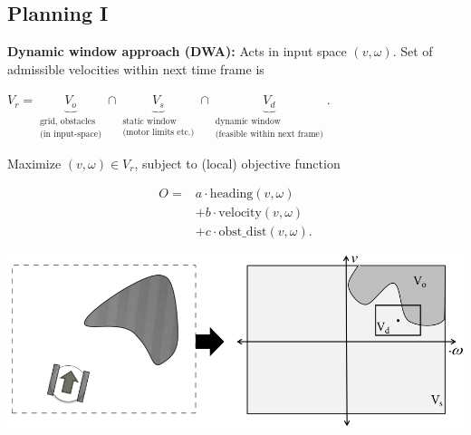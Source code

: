\documentclass[landscape]{article}
\newcommand{\vmspace}{\vspace{-7pt}}
\begin{document}
\begin{multicols}{3}
\section{Planning I}

\vmspace

\begin{minipage}{\columnwidth}
  \textbf{Dynamic window approach (DWA):} Acts in input space $(v,\omega)$. Set
  of admissible velocities within next time frame is
  \vmspace
  \begin{center}
    $
    V_r =
    \underbrace{V_o}_{\substack{\text{grid, obstacles} \\ \text{(in
    input-space)}}}
    \cap \underbrace{V_s}_{\substack{\text{static window} \\ \text{(motor
    limits etc.)}}}
    \cap \underbrace{V_d}_{\substack{\text{dynamic window} \\ \text{(feasible
    within next frame)}}}
    .
    $
  \end{center}
  \vmspace
  Maximize $(v,\omega)\in V_r$, subject to (local) objective function\\
  \vmspace
  \begin{minipage}{0.4\columnwidth}
    \vspace{-18pt}
    \begin{equation*}
      \begin{split}
        O =& a\cdot\mathrm{heading}(v,\omega)\\
        &+ b\cdot\mathrm{velocity}(v,\omega)\\
        &+ c\cdot \mathrm{obst\_dist}(v,\omega).
      \end{split}
    \end{equation*}
  \end{minipage}
  \begin{minipage}{0.59\columnwidth}
  \includegraphics[width=\columnwidth]{img/12_DynamicWindow.png}
  \end{minipage}
\end{minipage}


\end{multicols}
\end{document}
